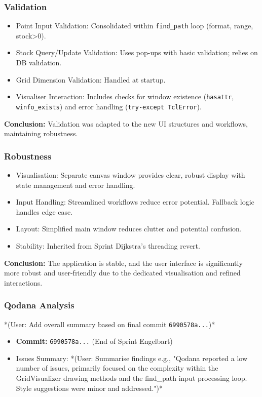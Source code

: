 \subsubsection{Validation}
\begin{itemize}
	\item Point Input Validation: Consolidated within \verb|find_path| loop (format, range, stock>0).
	\item Stock Query/Update Validation: Uses pop-ups with basic validation; relies on DB validation.
	\item Grid Dimension Validation: Handled at startup.
	\item Visualiser Interaction: Includes checks for window existence (\verb|hasattr|, \verb|winfo_exists|) and error handling (\verb|try-except TclError|).
\end{itemize}
\textbf{Conclusion:} Validation was adapted to the new UI structures and workflows, maintaining robustness.

\subsubsection{Robustness}
\begin{itemize}
	\item Visualisation: Separate canvas window provides clear, robust display with state management and error handling.
	\item Input Handling: Streamlined workflows reduce error potential. Fallback logic handles edge case.
	\item Layout: Simplified main window reduces clutter and potential confusion.
	\item Stability: Inherited from Sprint Dijkstra's threading revert.
\end{itemize}
\textbf{Conclusion:} The application is stable, and the user interface is significantly more robust and user-friendly due to the dedicated visualisation and refined interactions.

\subsubsection{Qodana Analysis}
*(User: Add overall summary based on final commit \verb|6990578a...|)*
\begin{itemize}
	\item \textbf{Commit:} \verb|6990578a...| (End of Sprint Engelbart)
	\item Issues Summary: *(User: Summarise findings e.g., "Qodana reported a low number of issues, primarily focused on the complexity within the GridVisualizer drawing methods and the find_path input processing loop. Style suggestions were minor and addressed.")*
\end{itemize}

